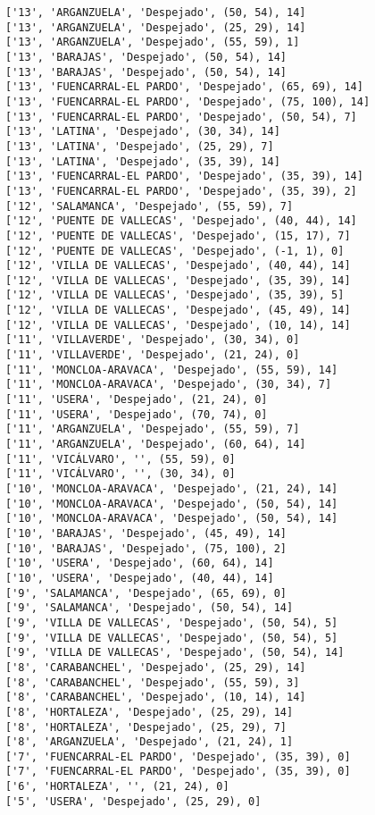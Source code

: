 \documentclass[11pt]{article}
\begin{document}
\begin{Verbatim}[commandchars=\\\{\}]
['13', 'ARGANZUELA', 'Despejado', (50, 54), 14]
['13', 'ARGANZUELA', 'Despejado', (25, 29), 14]
['13', 'ARGANZUELA', 'Despejado', (55, 59), 1]
['13', 'BARAJAS', 'Despejado', (50, 54), 14]
['13', 'BARAJAS', 'Despejado', (50, 54), 14]
['13', 'FUENCARRAL-EL PARDO', 'Despejado', (65, 69), 14]
['13', 'FUENCARRAL-EL PARDO', 'Despejado', (75, 100), 14]
['13', 'FUENCARRAL-EL PARDO', 'Despejado', (50, 54), 7]
['13', 'LATINA', 'Despejado', (30, 34), 14]
['13', 'LATINA', 'Despejado', (25, 29), 7]
['13', 'LATINA', 'Despejado', (35, 39), 14]
['13', 'FUENCARRAL-EL PARDO', 'Despejado', (35, 39), 14]
['13', 'FUENCARRAL-EL PARDO', 'Despejado', (35, 39), 2]
['12', 'SALAMANCA', 'Despejado', (55, 59), 7]
['12', 'PUENTE DE VALLECAS', 'Despejado', (40, 44), 14]
['12', 'PUENTE DE VALLECAS', 'Despejado', (15, 17), 7]
['12', 'PUENTE DE VALLECAS', 'Despejado', (-1, 1), 0]
['12', 'VILLA DE VALLECAS', 'Despejado', (40, 44), 14]
['12', 'VILLA DE VALLECAS', 'Despejado', (35, 39), 14]
['12', 'VILLA DE VALLECAS', 'Despejado', (35, 39), 5]
['12', 'VILLA DE VALLECAS', 'Despejado', (45, 49), 14]
['12', 'VILLA DE VALLECAS', 'Despejado', (10, 14), 14]
['11', 'VILLAVERDE', 'Despejado', (30, 34), 0]
['11', 'VILLAVERDE', 'Despejado', (21, 24), 0]
['11', 'MONCLOA-ARAVACA', 'Despejado', (55, 59), 14]
['11', 'MONCLOA-ARAVACA', 'Despejado', (30, 34), 7]
['11', 'USERA', 'Despejado', (21, 24), 0]
['11', 'USERA', 'Despejado', (70, 74), 0]
['11', 'ARGANZUELA', 'Despejado', (55, 59), 7]
['11', 'ARGANZUELA', 'Despejado', (60, 64), 14]
['11', 'VICÁLVARO', '', (55, 59), 0]
['11', 'VICÁLVARO', '', (30, 34), 0]
['10', 'MONCLOA-ARAVACA', 'Despejado', (21, 24), 14]
['10', 'MONCLOA-ARAVACA', 'Despejado', (50, 54), 14]
['10', 'MONCLOA-ARAVACA', 'Despejado', (50, 54), 14]
['10', 'BARAJAS', 'Despejado', (45, 49), 14]
['10', 'BARAJAS', 'Despejado', (75, 100), 2]
['10', 'USERA', 'Despejado', (60, 64), 14]
['10', 'USERA', 'Despejado', (40, 44), 14]
['9', 'SALAMANCA', 'Despejado', (65, 69), 0]
['9', 'SALAMANCA', 'Despejado', (50, 54), 14]
['9', 'VILLA DE VALLECAS', 'Despejado', (50, 54), 5]
['9', 'VILLA DE VALLECAS', 'Despejado', (50, 54), 5]
['9', 'VILLA DE VALLECAS', 'Despejado', (50, 54), 14]
['8', 'CARABANCHEL', 'Despejado', (25, 29), 14]
['8', 'CARABANCHEL', 'Despejado', (55, 59), 3]
['8', 'CARABANCHEL', 'Despejado', (10, 14), 14]
['8', 'HORTALEZA', 'Despejado', (25, 29), 14]
['8', 'HORTALEZA', 'Despejado', (25, 29), 7]
['8', 'ARGANZUELA', 'Despejado', (21, 24), 1]
['7', 'FUENCARRAL-EL PARDO', 'Despejado', (35, 39), 0]
['7', 'FUENCARRAL-EL PARDO', 'Despejado', (35, 39), 0]
['6', 'HORTALEZA', '', (21, 24), 0]
['5', 'USERA', 'Despejado', (25, 29), 0]

\end{Verbatim}
\end{document}
